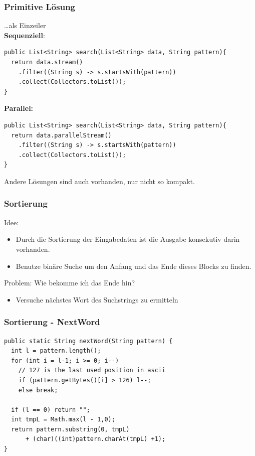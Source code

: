 \documentclass[11pt, xcolor=dvipsnames]{beamer}
\begin{document}
\begin{frame}[fragile]
	\frametitle{Primitive Lösung}
	\ldots als Einzeiler\\
	\textbf{Sequenziell}:
	
	\begin{lstlisting}
public List<String> search(List<String> data, String pattern){
  return data.stream()
    .filter((String s) -> s.startsWith(pattern))
    .collect(Collectors.toList());
}
	\end{lstlisting}
	\textbf{Parallel:}
		\begin{lstlisting}
public List<String> search(List<String> data, String pattern){
  return data.parallelStream()
    .filter((String s) -> s.startsWith(pattern))
    .collect(Collectors.toList());
}
		\end{lstlisting}

Andere Lösungen sind auch vorhanden, nur nicht so kompakt.
\end{frame}

	\begin{frame}
	\frametitle{Sortierung}
	Idee:
	\begin{itemize}
		\item Durch die Sortierung der Eingabedaten ist die Ausgabe konsekutiv darin vorhanden. 
		\item Benutze binäre Suche um den Anfang und das Ende dieses Blocks zu finden.
	\end{itemize}
	Problem: Wie bekomme ich das Ende hin?
	\begin{itemize}
		\item Versuche nächstes Wort des Suchstrings zu ermitteln
	\end{itemize}	
	\end{frame}
		
\begin{frame}[fragile]
	\frametitle{Sortierung - NextWord}
	\begin{lstlisting}
public static String nextWord(String pattern) {
  int l = pattern.length();	
  for (int i = l-1; i >= 0; i--) 
    // 127 is the last used position in ascii
    if (pattern.getBytes()[i] > 126) l--;
    else break;
    	
  if (l == 0) return "";	
  int tmpL = Math.max(l - 1,0);
  return pattern.substring(0, tmpL) 
	  + (char)((int)pattern.charAt(tmpL) +1);
}	
	\end{lstlisting}
\end{frame}
	
\end{document}
